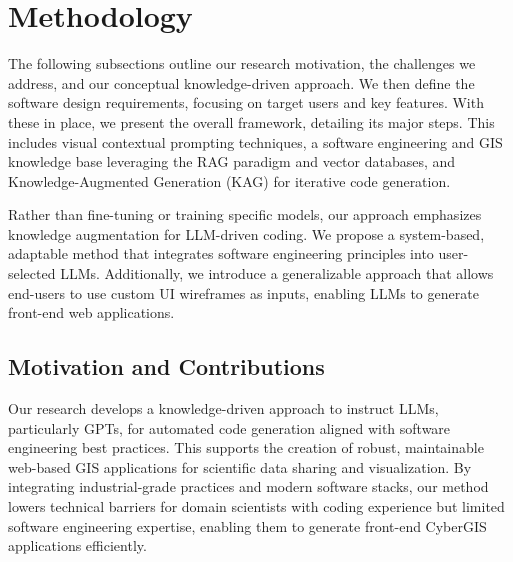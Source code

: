 \section{Methodology}
\label{Methdology}
The following subsections outline our research motivation, the challenges we address, and our conceptual knowledge-driven approach. We then define the software design requirements, focusing on target users and key features. With these in place, we present the overall framework, detailing its major steps. This includes visual contextual prompting techniques, a software engineering and GIS knowledge base leveraging the RAG paradigm and vector databases, and Knowledge-Augmented Generation (KAG) for iterative code generation.

Rather than fine-tuning or training specific models, our approach emphasizes knowledge augmentation for LLM-driven coding. We propose a system-based, adaptable method that integrates software engineering principles into user-selected LLMs. Additionally, we introduce a generalizable approach that allows end-users to use custom UI wireframes as inputs, enabling LLMs to generate front-end web applications.

\subsection{Motivation and Contributions}
Our research develops a knowledge-driven approach to instruct LLMs, particularly GPTs, for automated code generation aligned with software engineering best practices. This supports the creation of robust, maintainable web-based GIS applications for scientific data sharing and visualization. By integrating industrial-grade practices and modern software stacks, our method lowers technical barriers for domain scientists with coding experience but limited software engineering expertise, enabling them to generate front-end CyberGIS applications efficiently.

